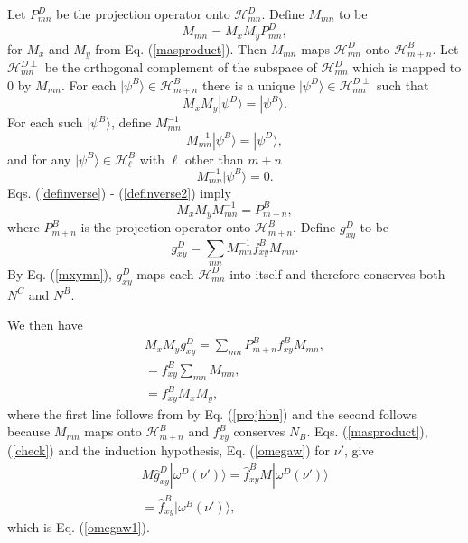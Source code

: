 \documentclass[12pt,amsmath,amssymb,onecolumn]{revtex4-2}
\begin{document}
Let $P^D_{mn}$ be the projection operator onto $\mathcal{H}^D_{mn}$.
Define $M_{mn}$ to be
\begin{equation}
  \label{mxymn}
  M_{mn} = M_x M_y P^D_{mn},
\end{equation}
for $M_x$ and $M_y$ from Eq. (\ref{masproduct}).
Then $M_{mn}$ maps $\mathcal{H}^D_{mn}$ onto $\mathcal{H}^B_{m+n}$.
Let $\mathcal{H}^{D\perp}_{mn}$  be the orthogonal complement
of the subspace of $\mathcal{H}^D_{mn}$ which is mapped
to 0 by $M_{mn}$. For each $|\psi^B \rangle  \in \mathcal{H}^B_{m+n}$
there is a unique $|\psi^D \rangle  \in \mathcal{H}^{D\perp}_{mn}$ such
that
\begin{equation}
  \label{definverse}
  M_x M_y |\psi^D \rangle  = |\psi^B \rangle .
\end{equation}
For each such $|\psi^B \rangle $, define $M_{mn}^{-1}$
\begin{equation}
  \label{definverse1}
  M_{mn}^{-1}|\psi^B \rangle  = |\psi^D \rangle ,
\end{equation}
and for any $|\psi^B \rangle  \in \mathcal{H}^B_\ell$ with
$\ell$ other than $m + n$
\begin{equation}
  \label{definverse2}
  M_{mn}^{-1}|\psi^B \rangle  = 0.
\end{equation}
Eqs. (\ref{definverse}) - (\ref{definverse2}) imply
\begin{equation}
  \label{projhbn}
  M_x M_y M_{mn}^{-1} = P^B_{m+n},
\end{equation}
where $P^B_{m+n}$ is the projection operator onto $\mathcal{H}^B_{m+n}$.
Define $g^D_{xy}$ to be
\begin{equation}
  \label{fdxy}
  g^D_{xy} = \sum_{mn} M_{mn}^{-1} f^B_{xy} M_{mn}.
\end{equation}
By Eq. (\ref{mxymn}), $g^D_{xy}$ maps each $\mathcal{H}^D_{mn}$
into itself and therefore conserves both $N^C$ and $N^B$.

  
We then have
\begin{multline}
  \label{check}
  M_x M_y g^D_{xy} = \sum_{mn} P^B_{m+n} f^B_{xy} M_{mn}, \\
  = f^B_{xy} \sum_{mn}  M_{mn}, \\
  = f^B_{xy} M_x M_y,
\end{multline}
where the first line follows from by Eq. (\ref{projhbn})
and the second follows because $M_{mn}$ maps onto
$\mathcal{H}^B_{m+n}$ and $f^B_{xy}$ conserves $N_B$.
Eqs. (\ref{masproduct}), (\ref{check}) and the induction hypothesis, Eq. (\ref{omegaw}) for
$\nu'$, give
\begin{multline}
  \label{check1}
  M \hat{g}^D_{xy} |\omega^D(\nu') \rangle  = \hat{f}^B_{xy} M|\omega^D(\nu') \rangle  \\
  = \hat{f}^B_{xy} |\omega^B(\nu') \rangle ,
\end{multline}
which is Eq. (\ref{omegaw1}).
\end{document}
